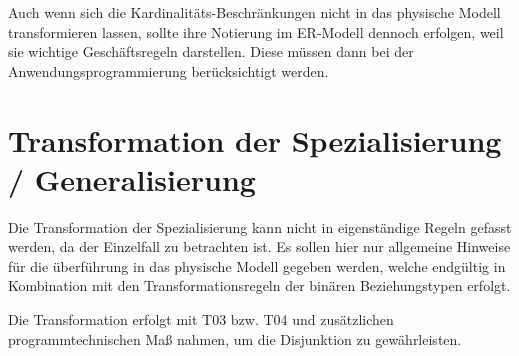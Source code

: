 Auch wenn sich die Kardinalitäts-Beschränkungen nicht in das physische Modell transformieren lassen, sollte ihre Notierung im ER-Modell dennoch erfolgen, weil sie wichtige Geschäftsregeln darstellen. Diese müssen dann bei der Anwendungsprogrammierung berück\-sichtigt werden.
\section{Transformation der Spezialisierung / Generalisierung}
Die Transformation der Spezialisierung kann nicht in eigenständige Regeln gefasst werden, da der Einzelfall zu betrachten ist. Es sollen hier nur allgemeine Hinweise für die überführung in das physische Modell gegeben werden, welche endgültig in Kombination mit den Transformationsregeln der binären Beziehungstypen erfolgt.
\begin{center}
\end{center}
\begin{center}
\end{center}
Die Transformation erfolgt mit T03 bzw. T04 und zusätzlichen programmtechnischen Maß nahmen, um die Disjunktion zu gewährleisten.
